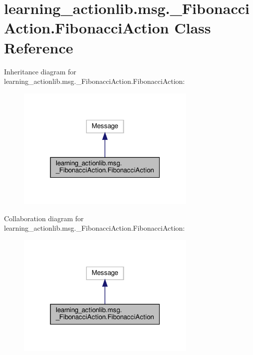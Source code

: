 \hypertarget{classlearning__actionlib_1_1msg_1_1__FibonacciAction_1_1FibonacciAction}{}\section{learning\+\_\+actionlib.\+msg.\+\_\+\+Fibonacci\+Action.\+Fibonacci\+Action Class Reference}
\label{classlearning__actionlib_1_1msg_1_1__FibonacciAction_1_1FibonacciAction}


Inheritance diagram for learning\+\_\+actionlib.\+msg.\+\_\+\+Fibonacci\+Action.\+Fibonacci\+Action\+:
\nopagebreak
\begin{figure}[H]
\begin{center}
\leavevmode
\includegraphics[width=244pt]{classlearning__actionlib_1_1msg_1_1__FibonacciAction_1_1FibonacciAction__inherit__graph}
\end{center}
\end{figure}


Collaboration diagram for learning\+\_\+actionlib.\+msg.\+\_\+\+Fibonacci\+Action.\+Fibonacci\+Action\+:
\nopagebreak
\begin{figure}[H]
\begin{center}
\leavevmode
\includegraphics[width=244pt]{classlearning__actionlib_1_1msg_1_1__FibonacciAction_1_1FibonacciAction__coll__graph}
\end{center}
\end{figure}
